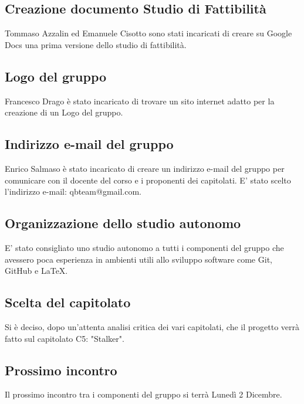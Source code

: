 \subsection{Creazione documento Studio di Fattibilità}
Tommaso Azzalin ed Emanuele Cisotto sono stati incaricati di creare su Google Docs una prima versione dello studio di fattibilità.\\

\subsection{Logo del gruppo}
Francesco Drago è stato incaricato di trovare un sito internet adatto per la creazione di un Logo del gruppo.\\

\subsection{Indirizzo e-mail del gruppo}
Enrico Salmaso è stato incaricato di creare un indirizzo e-mail del gruppo per comunicare con il docente del corso e i proponenti dei capitolati.
E' stato scelto l'indirizzo e-mail: qbteam@gmail.com.\\

\subsection{Organizzazione dello studio autonomo}
E' stato consigliato uno studio autonomo a tutti i componenti del gruppo che avessero poca esperienza in ambienti utili allo sviluppo software come Git, GitHub e LaTeX.\\

\subsection{Scelta del capitolato}
Si è deciso, dopo un'attenta analisi critica dei vari capitolati, che il progetto verrà fatto sul capitolato C5: "Stalker".\\

\subsection{Prossimo incontro}
Il prossimo incontro tra i componenti del gruppo si terrà Lunedì 2 Dicembre.\\
\clearpage